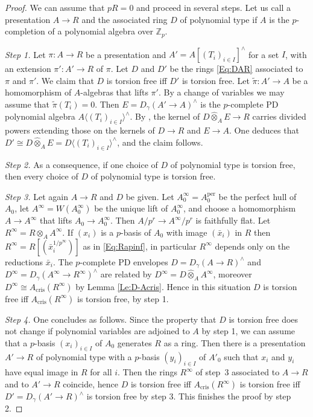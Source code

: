 \documentclass[a4paper,11pt]{article}
\theoremstyle{plain}
\theoremstyle{definition}
\theoremstyle{remark}
\theoremstyle{definition}
\numberwithin{Lemma}{section}
\numberwithin{Subpoint}{Lemma}
\numberwithin{equation}{section}
\newcommand{\ZZ}{{\mathbb{Z}}}
\newcommand{\hatotimes}{\mathbin{\hat\otimes}}
\DeclareMathOperator{\cris}{cris}
\DeclareMathOperator{\per}{per}
\newcommand{\chang}[1]{{#1}}
\begin{document}
\begin{proof}
We can assume that $pR=0$ and
proceed in several steps.
\chang{Let us call a presentation $A\to R$ and the associated ring $D$ of polynomial type if $A$ is the $p$-completion of a polynomial algebra over $\ZZ_p$.}

{\it Step 1.}
Let $\pi:A\to R$ be a presentation
and $A'=A[(T_i)_{i\in I}]^\wedge$ for a set $I$, 
with an extension $\pi':A'\to R$ of $\pi$.
Let $D$ and $D'$ be the rings \eqref{Eq:DAR}
associated to $\pi$ and $\pi'$.
We claim that $D$ is torsion free iff $D'$ is torsion free.
Let $\tilde\pi:A'\to A$ be a homomorphism of $A$-algebras that lifts $\pi'$. 
By a change of variables we may assume that $\tilde\pi(T_i)=0$.
Then $E=D_\gamma(A'\to A)^\wedge$ is 
the \chang{$p$-complete} PD polynomial algebra
$A\langle(T_i)_{i\in I}\rangle^\wedge$.
\chang{By \cite[I Cor.~1.7.2]{Berthelot:CohCristalline}, the kernel of $ D\hatotimes_AE\to R$ carries divided powers extending those on the kernels of  $D\to R$ and $E\to A$. One deduces that $D'\cong D\hatotimes_AE=D\langle(T_i)_{i\in I}\rangle^\wedge$,
and the claim follows.}

\chang{{\it Step 2.}
As a consequence, if one choice of $D$ of polynomial type is torsion free, then every choice of $D$ of polynomial type is torsion free.}

{\it Step 3.}
Let again $A\to R$ and $D$ be given. 
Let $A_0^\infty=A_0^{\per}$ be the perfect hull of $A_0$, 
let $A^\infty=W(A_0^\infty)$ be the unique lift of $A_0^\infty$, 
and choose a homomorphism $A\to A^\infty$ that lifts $A_0\to A_0^\infty$. 
Then $A/p^r\to A^\infty/p^r$ is faithfully flat.
Let $R^\infty=R\otimes_AA^\infty$.
If $(x_i)$ is a $p$-basis of $A_0$ 
with image $(\bar x_i)$ in $R$ then $R^\infty=R[(\bar x_i^{1/p^\infty})]$
as in \eqref{Eq:Rapinf}, in particular $R^\infty$ depends only on 
the reductions $\bar x_i$.
The \chang{$p$-complete} PD envelopes $D=D_\gamma(A\to R)^\wedge$
and $D^\infty=D_\gamma(A^\infty\to R^\infty)^\wedge$ 
are related by $D^\infty=D\hatotimes_AA^\infty$,
moreover $D^\infty\cong A_{\cris}(R^\infty)$ by Lemma \ref{Le:D-Acris}.
Hence in this situation $D$ is torsion free 
iff $A_{\cris}(R^\infty)$ is torsion free, \chang{by step 1.}

{\it Step 4.}
One concludes as follows. 
\chang{Since the property that $D$ is torsion free does not change if 
polynomial variables are adjoined to $A$ by step 1, 
we can assume that a $p$-basis $(x_i)_{i\in I}$ of $A_0$ generates $R$ as a ring.
Then there is a presentation $A'\to R$ of polynomial type with a $p$-basis $(y_i)_{i\in I}$ of $A'_0$ such that $x_i$ and $y_i$ have equal image in $R$ for all $i$.
Then the rings $R^\infty$ of step~3 associated to $A\to R$ and to $A'\to R$ coincide, 
hence $D$ is torsion free iff $A_{\cris}(R^\infty)$ is torsion free
iff $D'=D_\gamma(A'\to R)^\wedge$ is torsion free by step 3.
This finishes the proof by step 2.}
\end{proof}
\end{document}
